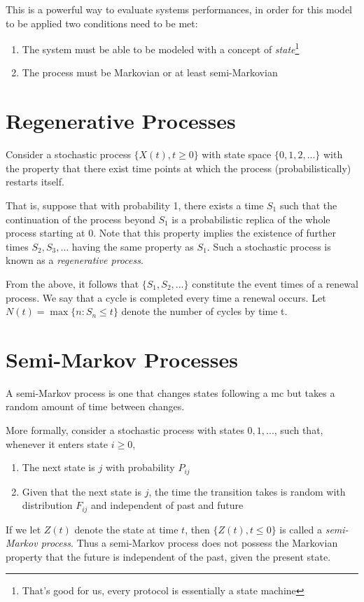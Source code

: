 This is a powerful way to evaluate systems performances, in order for this model to be applied two conditions need to be met:
\begin{enumerate}
	\item The system must be able to be modeled with a concept of \emph{state}\footnote{That's good for us, every protocol is essentially a state machine}
	\item The process must be Markovian or at least semi-Markovian
\end{enumerate}

\section{Regenerative Processes}

Consider a stochastic process $\{X(t), t \geq 0\}$ with state space $\{0, 1, 2, ... \}$ with the property that there exist time points at which the process (probabilistically) restarts itself.

That is, suppose that with probability 1, there exists a time $S_1$
such that the continuation of the process beyond $S_1$ is a probabilistic replica of the whole process starting at 0. Note that this property implies the existence of further times $S_2 , S_3 , \dots$ having the same property as $S_1$. Such a stochastic process is known as a \emph{regenerative process}.

From the above, it follows that $\{S_1 , S_2 , ...\}$ constitute the event times of a renewal process. We say that a cycle is completed every time a renewal occurs. Let $N(t) = \max\{n: S_n \leq t\}$ denote the number of cycles by time t.

\section{Semi-Markov Processes}
A semi-Markov process is one that changes states following a \gls{mc} but takes a random amount of time between changes.

More formally, consider a stochastic process with states $0, 1, ...  $, such that, whenever it enters state $i\geq 0$,
\begin{enumerate}
	\item The next state is $j$ with probability $P_{ij}$
	\item Given that the next state is $j$, the time the transition takes is random with distribution $F_{ij}$ and independent of past and future
\end{enumerate}
If we let $Z(t)$ denote the state at time $t$, then $\{Z(t), t\leq 0\}$ is called a \emph{semi-Markov
process}.
Thus a semi-Markov process does not possess the Markovian property that
the future is independent of the past, given the present state.

